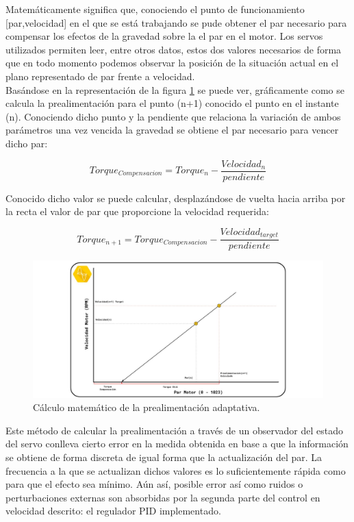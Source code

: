 Matemáticamente significa que, conociendo el punto de funcionamiento [par,velocidad] en el que se está trabajando se pude obtener el par necesario para compensar los efectos de la gravedad sobre la el par en el motor. Los servos utilizados permiten leer, entre otros datos, estos dos valores necesarios de forma que en todo momento podemos observar la posición de la situación actual en el plano representado de par frente a velocidad.
\\

Basándose en la representación de la figura \ref{fig:Control:calculo_control} se puede ver, gráficamente como se calcula la prealimentación para el punto (n+1) conocido el punto en el instante (n). Conociendo dicho punto y la pendiente que relaciona la variación de ambos parámetros una vez vencida la gravedad se obtiene el par necesario para vencer dicho par:

\begin{equation}
    Torque_{Compensacion} =  Torque_n - \frac{Velocidad_{n}}{pendiente}
\end{equation}

Conocido dicho valor se puede calcular, desplazándose de vuelta hacia arriba por la recta el valor de par que proporcione la velocidad requerida:

\begin{equation}
    Torque_{n+1} = Torque_{Compensacion} - \frac{Velocidad_{target}}{pendiente}
\end{equation}

\begin{figure}[H]
    \centering
    \includegraphics[width=1\textwidth]{figuras/Imagenes_Control/calculo_control.jpg}
    \caption{Cálculo matemático de la prealimentación adaptativa.}
    \label{fig:Control:calculo_control}
\end{figure}

Este método de calcular la prealimentación a través de un observador del estado del servo conlleva cierto error en la medida obtenida en base a que la información se obtiene de forma discreta de igual forma que la actualización del par. La frecuencia a la que se actualizan dichos valores es lo suficientemente rápida como para que el efecto sea mínimo. Aún así, posible error así como ruidos o perturbaciones externas son absorbidas por la segunda parte del control en velocidad descrito: el regulador PID implementado.
\\

